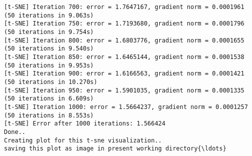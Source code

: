 \documentclass[11pt]{article}
\begin{document}
\begin{Verbatim}[commandchars=\\\{\}]
[t-SNE] Iteration 700: error = 1.7647167, gradient norm = 0.0001961 (50 iterations in 9.063s)
[t-SNE] Iteration 750: error = 1.7193680, gradient norm = 0.0001796 (50 iterations in 9.754s)
[t-SNE] Iteration 800: error = 1.6803776, gradient norm = 0.0001655 (50 iterations in 9.540s)
[t-SNE] Iteration 850: error = 1.6465144, gradient norm = 0.0001538 (50 iterations in 9.953s)
[t-SNE] Iteration 900: error = 1.6166563, gradient norm = 0.0001421 (50 iterations in 10.270s)
[t-SNE] Iteration 950: error = 1.5901035, gradient norm = 0.0001335 (50 iterations in 6.609s)
[t-SNE] Iteration 1000: error = 1.5664237, gradient norm = 0.0001257 (50 iterations in 8.553s)
[t-SNE] Error after 1000 iterations: 1.566424
Done..
Creating plot for this t-sne visualization..
saving this plot as image in present working directory{\ldots}

    \end{Verbatim}

    \begin{center}
    \end{center}
    { \hspace*{\fill} \\}
    
\end{document}
